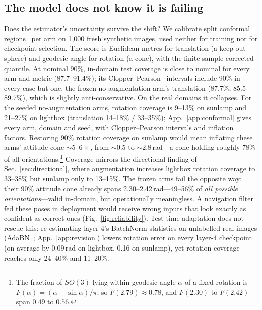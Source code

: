 \documentclass{article}
\begin{document}
\subsection{The model does not know it is failing}
\label{sec:conformal}

Does the estimator's uncertainty survive the shift? We calibrate split conformal
regions~\citep{vovk2005algorithmic,lei2018distribution,angelopoulos2023gentle} per arm on
1{,}000 fresh synthetic images, used neither for training nor for checkpoint selection.
The score is Euclidean metres for translation (a keep-out sphere) and geodesic angle for
rotation (a cone), with the finite-sample-corrected quantile. At nominal 90\%, in-domain test coverage is close to nominal for every
arm and metric (87.7--91.4\%); its Clopper--Pearson~\citep{clopper1934use} intervals
include 90\% in every case but one, the frozen no-augmentation arm's translation
(87.7\%, 85.5--89.7\%), which is slightly anti-conservative. On the real domains it collapses. For the seeded no-augmentation
arms, rotation coverage is 9--13\% on sunlamp and 21--27\% on lightbox (translation
14--18\% / 33--35\%); App.~\ref{app:conformal} gives every arm, domain and seed, with
Clopper--Pearson intervals and inflation factors. Restoring 90\% rotation coverage on
sunlamp would mean inflating these arms' attitude cone ${\sim}5$--$6\times$, from ${\sim}0.5$ to
${\sim}2.8$\,rad---a cone holding roughly 78\% of all
orientations.\footnote{The fraction of $SO(3)$ lying within geodesic angle
$\alpha$ of a fixed rotation is $F(\alpha) = (\alpha - \sin\alpha)/\pi$; so
$F(2.79) \approx 0.78$, and $F(2.30)$ to $F(2.42)$ span $0.49$ to $0.56$.}
Coverage mirrors the directional finding of
Sec.~\ref{sec:directional}, where augmentation increases lightbox rotation coverage to
33--38\% but sunlamp only to 13--15\%. The frozen arms fail the opposite
way: their 90\% attitude cone already spans 2.30--2.42\,rad---49--56\% of
\emph{all possible orientations}---valid in-domain, but operationally meaningless.
A navigation filter fed these poses in deployment would receive wrong inputs that look
exactly as confident as correct ones (Fig.~\ref{fig:reliability}).
Test-time adaptation does not rescue this: re-estimating layer 4's BatchNorm statistics
on unlabelled real images (AdaBN~\citep{li2018adabn}; App.~\ref{app:revision}) lowers
rotation error on every layer-4 checkpoint (on average by 0.09\,rad on lightbox, 0.16
on sunlamp), yet rotation coverage reaches only 24--40\% and 11--20\%.
\end{document}
